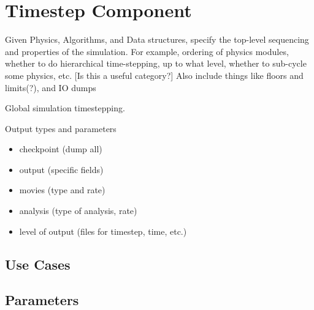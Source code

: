 \section{Timestep Component} \label{s:component-timestep}

Given Physics, Algorithms, and Data structures, specify the top-level
sequencing and properties of the simulation.  For example, ordering of
physics modules, whether to do hierarchical time-stepping, up to what
level, whether to sub-cycle some physics, etc. [Is this a useful
category?]  Also include things like floors and limits(?), and IO
dumps

Global simulation timestepping.

Output types and parameters

\begin{itemize}
\item checkpoint (dump all)
\item output (specific fields)
\item movies (type and rate)
\item analysis (type of analysis, rate)
\item level of output (files for timestep, time, etc.)
\end{itemize}

\subsection{Use Cases}
\subsection{Parameters}
